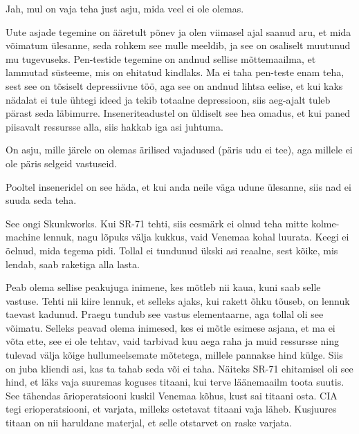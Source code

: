 
Jah, mul on vaja teha just asju, mida veel ei ole olemas. 


Uute asjade tegemine on ääretult põnev ja olen viimasel ajal saanud
aru, et mida võimatum ülesanne, seda rohkem see mulle meeldib, ja see on osaliselt muutunud mu tugevuseks. Pen-testide tegemine on andnud sellise mõttemaailma, et lammutad süsteeme, mis 
on ehitatud kindlaks. Ma ei taha pen-teste enam teha, sest see on 
tõsiselt depressiivne töö, aga see on andnud lihtsa eelise, et kui 
kaks nädalat ei tule ühtegi ideed ja tekib 
totaalne depressioon, siis aeg-ajalt tuleb pärast seda läbimurre. 
Inseneriteadustel on üldiselt see hea omadus, et kui paned piisavalt 
ressursse alla, siis hakkab iga asi juhtuma. 


On asju, mille järele on olemas ärilised vajadused (päris udu ei tee), aga 
millele ei ole päris selgeid vastuseid. 

Pooltel inseneridel on see häda, et kui anda neile väga udune 
ülesanne, siis nad ei suuda seda teha.


See ongi Skunkworks. Kui 
SR-71 
tehti, siis eesmärk ei olnud teha mitte kolme-machine lennuk, nagu lõpuks välja 
kukkus, vaid Venemaa kohal luurata. Keegi ei 
öelnud, mida tegema pidi. Tollal ei 
tundunud ükski asi reaalne, sest kõike, mis lendab, saab raketiga alla lasta. 

Peab olema sellise peakujuga inimene, kes mõtleb nii kaua, kuni saab selle 
vastuse. Tehti nii kiire lennuk, et selleks ajaks, kui rakett õhku tõuseb, on 
lennuk taevast kadunud. Praegu tundub see vastus elementaarne, aga 
tollal oli see võimatu. Selleks peavad olema 
inimesed, kes ei mõtle esimese asjana, et ma ei võta ette, see ei ole 
tehtav, vaid tarbivad kuu aega raha ja muid ressursse ning 
tulevad välja kõige hullumeelsemate mõtetega, millele pannakse hind külge. 
Siis on juba kliendi asi, kas ta tahab seda või ei taha. Näiteks SR-71 
ehitamisel oli see hind, et läks vaja suuremas koguses titaani, kui terve 
läänemaailm toota suutis. See tähendas ärioperatsiooni kuskil Venemaa kõhus, 
kust sai titaani osta. CIA tegi erioperatsiooni, et varjata, milleks ostetavat titaani vaja läheb. Kusjuures titaan on 
nii haruldane materjal, et selle otstarvet on raske varjata. 

